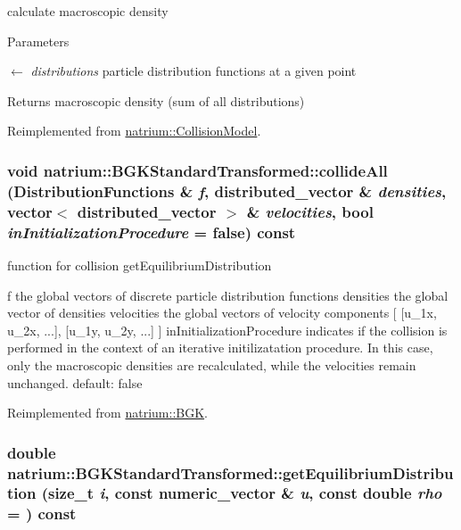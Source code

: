calculate macroscopic density 
\begin{DoxyParams}{Parameters}
\item[\mbox{$\leftarrow$} {\em distributions}]particle distribution functions at a given point \end{DoxyParams}
\begin{DoxyReturn}{Returns}
macroscopic density (sum of all distributions) 
\end{DoxyReturn}


Reimplemented from \hyperlink{classnatrium_1_1CollisionModel_ae1c879c87ac210a227a8e3da2d0ac385}{natrium::CollisionModel}.\hypertarget{classnatrium_1_1BGKStandardTransformed_a00c806c32f16e518117c818a29c2fef4}{
\subsubsection[{collideAll}]{\setlength{\rightskip}{0pt plus 5cm}void natrium::BGKStandardTransformed::collideAll ({\bf DistributionFunctions} \& {\em f}, \/  distributed\_\-vector \& {\em densities}, \/  vector$<$ distributed\_\-vector $>$ \& {\em velocities}, \/  bool {\em inInitializationProcedure} = {\ttfamily false}) const}}
\label{classnatrium_1_1BGKStandardTransformed_a00c806c32f16e518117c818a29c2fef4}


function for collision getEquilibriumDistribution

f the global vectors of discrete particle distribution functions densities the global vector of densities velocities the global vectors of velocity components \mbox{[} \mbox{[}u\_\-1x, u\_\-2x, ...\mbox{]}, \mbox{[}u\_\-1y, u\_\-2y, ...\mbox{]} \mbox{]} inInitializationProcedure indicates if the collision is performed in the context of an iterative initilizatation procedure. In this case, only the macroscopic densities are recalculated, while the velocities remain unchanged. default: false 

Reimplemented from \hyperlink{classnatrium_1_1BGK_ae5e97a4995fe927e9042a6cffac80acc}{natrium::BGK}.\hypertarget{classnatrium_1_1BGKStandardTransformed_a870465cc026f92c8ffba899af6f95634}{
\subsubsection[{getEquilibriumDistribution}]{\setlength{\rightskip}{0pt plus 5cm}double natrium::BGKStandardTransformed::getEquilibriumDistribution (size\_\-t {\em i}, \/  const numeric\_\-vector \& {\em u}, \/  const double {\em rho} = {}) const}}
\label{classnatrium_1_1BGKStandardTransformed_a870465cc026f92c8ffba899af6f95634}



